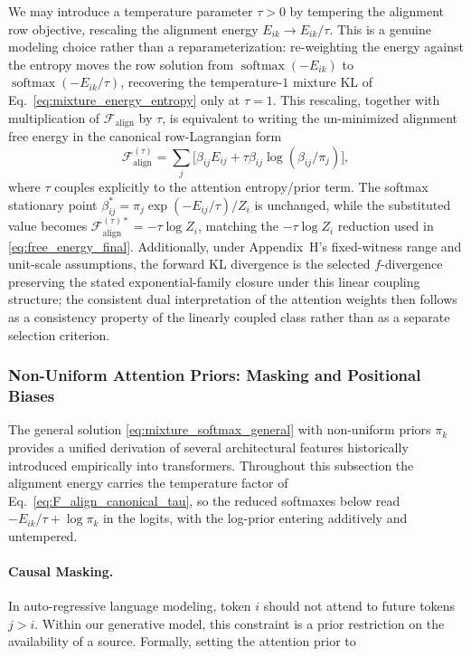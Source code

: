 \documentclass[twoside,11pt]{article}
\begin{document}
We may introduce a temperature parameter $\tau > 0$ by tempering the alignment row objective, rescaling the alignment energy $E_{ik} \to E_{ik}/\tau$. This is a genuine modeling choice rather than a reparameterization: re-weighting the energy against the entropy moves the row solution from $\operatorname{softmax}(-E_{ik})$ to $\operatorname{softmax}(-E_{ik}/\tau)$, recovering the temperature-$1$ mixture KL of Eq.~\eqref{eq:mixture_energy_entropy} only at $\tau = 1$. This rescaling, together with multiplication of $\mathcal{F}_{\text{align}}$ by $\tau$, is equivalent to writing the un-minimized alignment free energy in the canonical row-Lagrangian form
\begin{equation}
\mathcal{F}_{\text{align}}^{(\tau)} = \sum_j \big[\beta_{ij} E_{ij} + \tau \beta_{ij}\log(\beta_{ij}/\pi_j)\big],
\label{eq:F_align_canonical_tau}
\end{equation}
where $\tau$ couples explicitly to the attention entropy/prior term. The softmax stationary point $\beta_{ij}^* = \pi_j \exp(-E_{ij}/\tau)/Z_i$ is unchanged, while the substituted value becomes $\mathcal{F}_{\text{align}}^{(\tau)*} = -\tau\log Z_i$, matching the $-\tau\log Z_i$ reduction used in \eqref{eq:free_energy_final}. Additionally, under Appendix~H's fixed-witness range and unit-scale assumptions, the forward KL divergence is the selected $f$-divergence preserving the stated exponential-family closure under this linear coupling structure; the consistent dual interpretation of the attention weights then follows as a consistency property of the linearly coupled class rather than as a separate selection criterion.

\subsubsection{Non-Uniform Attention Priors: Masking and Positional Biases}
\label{sec:nonuniform_priors}

The general solution \eqref{eq:mixture_softmax_general} with non-uniform priors $\pi_k$ provides a unified derivation of several architectural features historically introduced empirically into transformers. Throughout this subsection the alignment energy carries the temperature factor of Eq.~\eqref{eq:F_align_canonical_tau}, so the reduced softmaxes below read $-E_{ik}/\tau + \log\pi_k$ in the logits, with the log-prior entering additively and untempered.

\paragraph{Causal Masking.}
In auto-regressive language modeling, token $i$ should not attend to future tokens $j > i$. Within our generative model, this constraint is a prior restriction on the availability of a source. Formally, setting the attention prior to
\end{document}
